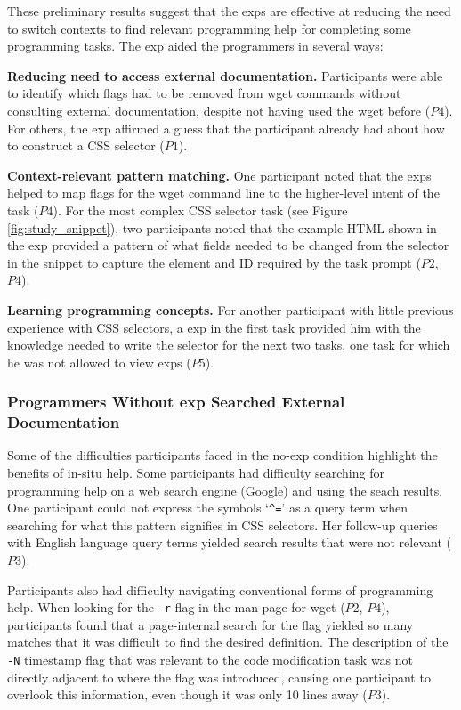 

These preliminary results suggest that the \glspl{exp} are effective at reducing the need to switch contexts to find relevant programming help  for completing some programming tasks. 
The \gls{exp} aided the programmers in several ways:

{\bf Reducing need to access external documentation.}
Participants were  able to identify which flags had to be removed from wget commands without consulting external documentation, despite not having used the wget before ($P4$).
For others, the \gls{exp} affirmed a guess that the participant already had about how to construct a CSS selector ($P1$).

{\bf Context-relevant pattern matching.}
One participant noted that the \glspl{exp} helped  to map flags for the wget command line to the higher-level intent of the task ($P4$). 
For the most complex CSS selector task (see Figure \ref{fig:study_snippet}), two participants noted
that the example HTML shown in the \gls{exp} 
provided a pattern of what fields needed to be changed  from the selector in the snippet to capture the element and ID required by the task prompt ($P2$, $P4$).

{\bf Learning programming concepts.}
For another participant with little previous experience with CSS selectors, a \gls{exp} in  the first task provided him with the knowledge needed to write the selector for the next two tasks, one task for which he was not allowed to view \glspl{exp} ($P5$).

\subsubsection{Programmers Without \Gls{exp} Searched External Documentation}

Some of the difficulties participants faced in the no-\gls{exp} condition  highlight the benefits of in-situ help.
Some participants had difficulty searching for programming help on a web search engine (Google) and using the seach results.
One participant could not express the symbols `\texttt{\^{}=}' as a query term when searching for what  this pattern signifies in CSS selectors.
Her follow-up queries with English language query terms  yielded search results that were not relevant ($P3$).

Participants also had difficulty navigating conventional forms of programming help.
When looking for the \texttt{-r} flag in the man page for wget ($P2$, $P4$), participants found that a page-internal  search for the flag yielded so many matches that it was difficult to find the desired definition.
The description of the \texttt{-N} timestamp flag that was relevant to the code modification task was not directly adjacent to where the flag was introduced, causing one participant to overlook this information, even though it was only 10 lines away ($P3$).

